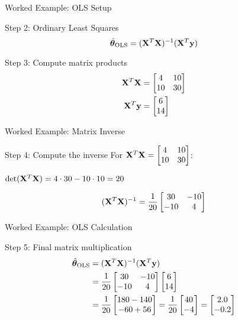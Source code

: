 \documentclass{beamer}
\begin{document}
\begin{frame}{Worked Example: OLS Setup}
\begin{codebox}{Step 2: Ordinary Least Squares}
$$\hat{\boldsymbol{\theta}}_{\text{OLS}} = (\mathbf{X}^{T}\mathbf{X})^{-1}(\mathbf{X}^{T}\mathbf{y})$$
\end{codebox}
\pause

\begin{codebox}{Step 3: Compute matrix products}
\begin{align*}
\mathbf{X}^{T}\mathbf{X} &= \begin{bmatrix} 4 & 10 \\ 10 & 30 \end{bmatrix} \\
\mathbf{X}^{T}\mathbf{y} &= \begin{bmatrix} 6 \\ 14 \end{bmatrix}
\end{align*}
\end{codebox}
\end{frame}

\begin{frame}{Worked Example: Matrix Inverse}
\begin{codebox}{Step 4: Compute the inverse}
For $\mathbf{X}^T\mathbf{X} = \begin{bmatrix} 4 & 10 \\ 10 & 30 \end{bmatrix}$:

$\operatorname{det}(\mathbf{X}^T\mathbf{X}) = 4 \cdot 30 - 10 \cdot 10 = 20$

$$(\mathbf{X}^{T}\mathbf{X})^{-1} = \frac{1}{20} \begin{bmatrix} 30 & -10 \\ -10 & 4 \end{bmatrix}$$
\end{codebox}
\end{frame}

\begin{frame}{Worked Example: OLS Calculation}
\begin{codebox}{Step 5: Final matrix multiplication}
\begin{align*}
\hat{\boldsymbol{\theta}}_{\text{OLS}} &= (\mathbf{X}^{T}\mathbf{X})^{-1}(\mathbf{X}^{T}\mathbf{y}) \\
&= \frac{1}{20} \begin{bmatrix} 30 & -10 \\ -10 & 4 \end{bmatrix} \begin{bmatrix} 6 \\ 14 \end{bmatrix} \\
&= \frac{1}{20} \begin{bmatrix} 180-140 \\ -60+56 \end{bmatrix} = \frac{1}{20} \begin{bmatrix} 40 \\ -4 \end{bmatrix} = \begin{bmatrix} 2.0 \\ -0.2 \end{bmatrix}
\end{align*}
\end{codebox}
\end{frame}
\end{document}

